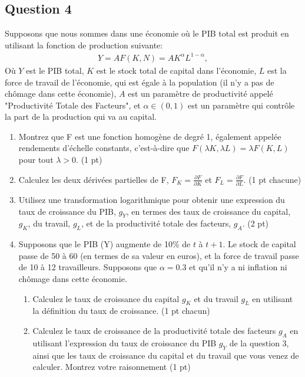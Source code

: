 \documentclass[11pt]{article}
\begin{document}
\subsection*{Question 4}
Supposons que nous sommes dans une économie où le PIB total est produit en utilisant la fonction de production suivante:
\begin{align*}
    Y = A F(K,N) = A K^{\alpha} L^{1-\alpha},
\end{align*}
Où \(Y\) est le PIB total, \(K\) est le stock total de capital dans l'économie, \(L\) est la force de travail de l'économie, qui est égale à la population (il n'y a pas de chômage dans cette économie), \(A\) est un paramètre de productivité appelé "Productivité Totale des Facteurs", et \(\alpha \in (0,1)\) est un paramètre qui contrôle la part de la production qui va au capital.

\begin{enumerate}
    \item Montrez que F est une fonction homogène de degré 1, également appelée rendements d'échelle constants, c'est-à-dire que \(F(\lambda K, \lambda L) = \lambda F(K,L)\) pour tout \(\lambda > 0\). (1 pt)
    \item Calculez les deux dérivées partielles de F, \(F_K = \frac{\partial F }{\partial K} \) et \(F_{L} = \frac{\partial F }{\partial L} \). (1 pt chacune)
    \item Utilisez une transformation logarithmique pour obtenir une expression du taux de croissance du PIB, \(g_Y\), en termes des taux de croissance du capital, \(g_K\), du travail, \(g_L\), et de la productivité totale des facteurs, \(g_A\). (2 pt)
    \item Supposons que le PIB (Y) augmente de 10\% de \(t\) à \(t+1\). Le stock de capital passe de 50 à 60 (en termes de sa valeur en euros), et la force de travail passe de 10 à 12 travailleurs. Supposons que \(\alpha = 0.3\) et qu'il n'y a ni inflation ni chômage dans cette économie.
    \begin{enumerate}
        \item Calculez le taux de croissance du capital \(g_K\) et du travail \(g_L\) en utilisant la définition du taux de croissance. (1 pt chacun)
        \item Calculez le taux de croissance de la productivité totale des facteurs \(g_A\) en utilisant l'expression du taux de croissance du PIB \(g_Y\) de la question 3, ainsi que les taux de croissance du capital et du travail que vous venez de calculer. Montrez votre raisonnement (1 pt)
    \end{enumerate}
\end{enumerate}
\end{document}
